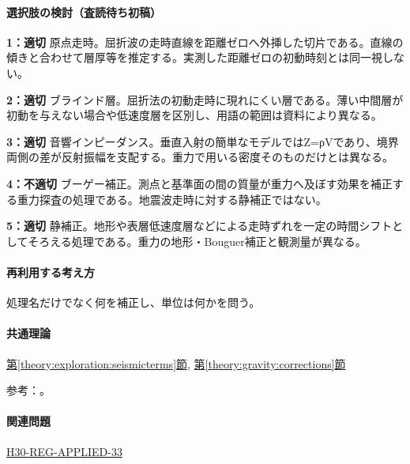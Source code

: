 \paragraph{選択肢の検討（査読待ち初稿）}\mbox{}\par

\noindent\textbf{1：適切} 原点走時。屈折波の走時直線を距離ゼロへ外挿した切片である。直線の傾きと合わせて層厚等を推定する。実測した距離ゼロの初動時刻とは同一視しない。\par

\noindent\textbf{2：適切} ブラインド層。屈折法の初動走時に現れにくい層である。薄い中間層が初動を与えない場合や低速度層を区別し、用語の範囲は資料により異なる。\par

\noindent\textbf{3：適切} 音響インピーダンス。垂直入射の簡単なモデルではZ=ρVであり、境界両側の差が反射振幅を支配する。重力で用いる密度そのものだけとは異なる。\par

\noindent\textbf{4：不適切} ブーゲー補正。測点と基準面の間の質量が重力へ及ぼす効果を補正する重力探査の処理である。地震波走時に対する静補正ではない。\par

\noindent\textbf{5：適切} 静補正。地形や表層低速度層などによる走時ずれを一定の時間シフトとしてそろえる処理である。重力の地形・Bouguer補正と観測量が異なる。\par

\paragraph{再利用する考え方} 処理名だけでなく何を補正し、単位は何かを問う。

\paragraph{共通理論} \hyperref[theory:exploration:seismicterms]{第\ref*{theory:exploration:seismicterms}節}, \hyperref[theory:gravity:corrections]{第\ref*{theory:gravity:corrections}節}

\par 参考：\cite{usgs_refraction2013,epa_seismic_reflection,usgs_static2004,usgs_processing2000}。

\paragraph{関連問題} \hyperref[q:h30-reg-applied-33]{H30-REG-APPLIED-33}

